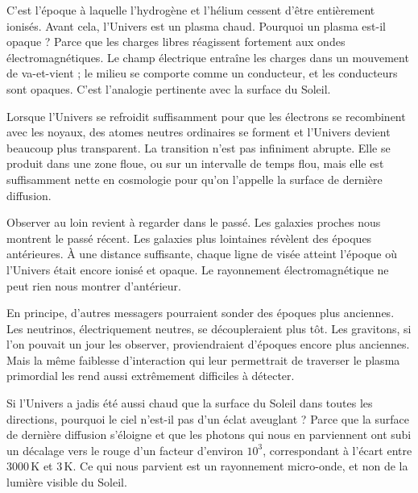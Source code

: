 C’est l’époque à laquelle l’hydrogène et l’hélium cessent d’être entièrement ionisés. Avant cela, l’Univers est un plasma chaud. Pourquoi un plasma est-il opaque ? Parce que les charges libres réagissent fortement aux ondes électromagnétiques. Le champ électrique entraîne les charges dans un mouvement de va-et-vient ; le milieu se comporte comme un conducteur, et les conducteurs sont opaques. C’est l’analogie pertinente avec la surface du Soleil.

Lorsque l’Univers se refroidit suffisamment pour que les électrons se recombinent avec les noyaux, des atomes neutres ordinaires se forment et l’Univers devient beaucoup plus transparent. La transition n’est pas infiniment abrupte. Elle se produit dans une zone floue, ou sur un intervalle de temps flou, mais elle est suffisamment nette en cosmologie pour qu’on l’appelle la surface de dernière diffusion.

Observer au loin revient à regarder dans le passé. Les galaxies proches nous montrent le passé récent. Les galaxies plus lointaines révèlent des époques antérieures. À une distance suffisante, chaque ligne de visée atteint l’époque où l’Univers était encore ionisé et opaque. Le rayonnement électromagnétique ne peut rien nous montrer d’antérieur.

En principe, d’autres messagers pourraient sonder des époques plus anciennes. Les neutrinos, électriquement neutres, se découpleraient plus tôt. Les gravitons, si l’on pouvait un jour les observer, proviendraient d’époques encore plus anciennes. Mais la même faiblesse d’interaction qui leur permettrait de traverser le plasma primordial les rend aussi extrêmement difficiles à détecter.

Si l’Univers a jadis été aussi chaud que la surface du Soleil dans toutes les directions, pourquoi le ciel n’est-il pas d’un éclat aveuglant ? Parce que la surface de dernière diffusion s’éloigne et que les photons qui nous en parviennent ont subi un décalage vers le rouge d’un facteur d’environ \(10^3\), correspondant à l’écart entre \(3000\,\mathrm K\) et \(3\,\mathrm K\). Ce qui nous parvient est un rayonnement micro-onde, et non de la lumière visible du Soleil.

\begin{classroomqa}
\end{classroomqa}


